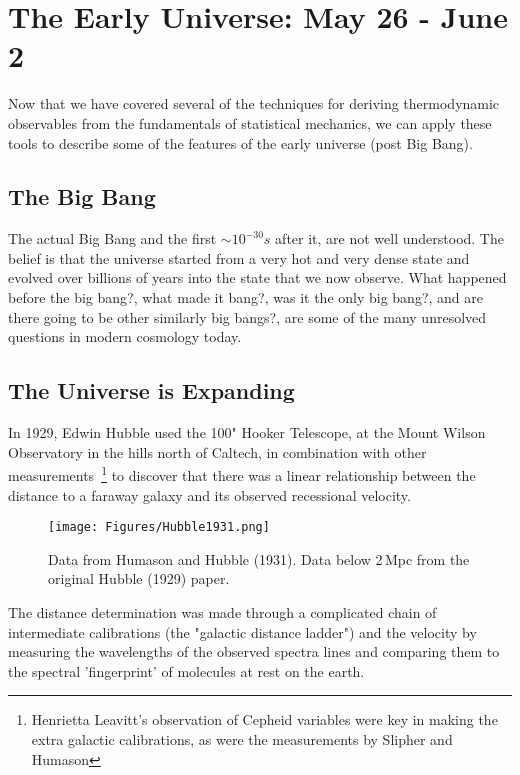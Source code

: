 \section{The Early Universe: May 26 - June 2}
Now that we have covered several of the techniques for deriving thermodynamic observables from the fundamentals of statistical mechanics, we can apply these tools to describe some of the features of the early universe (post Big Bang).


\subsection{The Big Bang}
The actual Big Bang and the first $\sim 10^{-30} s$ after it, are not well understood. The belief is that the universe started from a very hot and very dense state and evolved over billions of years into the state that we now observe. What happened before the big bang?, what made it bang?, was it the only big bang?, and are there going to be other similarly big bangs?, are some of the many unresolved questions in modern cosmology today.

\subsection{The Universe is Expanding}
In 1929, Edwin Hubble used the 100" Hooker Telescope, at the Mount Wilson Observatory in the hills north of Caltech, in combination with other
measurements~\footnote{Henrietta Leavitt's observation of Cepheid variables were key in making the extra galactic calibrations, as were the measurements by
Slipher and Humason} to discover that there was a linear relationship between the distance to a faraway galaxy and its observed recessional velocity.
\begin{figure}[h]
\centering
\texttt{[image: Figures/Hubble1931.png]}
\caption{Data from Humason and Hubble (1931). Data below 2\,Mpc from
	the original Hubble (1929) paper.}
\label{fig:Hubble}
\end{figure}
The distance determination was made through a complicated chain of intermediate calibrations (the "galactic distance ladder") and the velocity by measuring the wavelengths of the observed spectra lines and comparing them to the spectral 'fingerprint' of molecules at rest on the earth.\\

